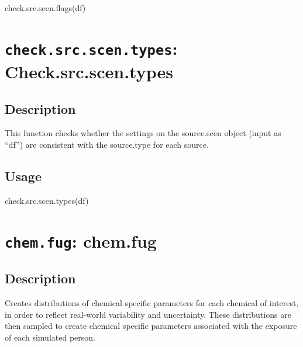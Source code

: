 \documentclass[
]{article}
\newenvironment{Shaded}{\begin{snugshade}}{\end{snugshade}}
\newcommand{\FunctionTok}[1]{\textcolor[rgb]{0.00,0.00,0.00}{#1}}
\newcommand{\NormalTok}[1]{#1}
\begin{document}
\begin{Shaded}
\begin{Highlighting}[]
\FunctionTok{check.src.scen.flags}\NormalTok{(df)}
\end{Highlighting}
\end{Shaded}

\hypertarget{check.src.scen.types-check.src.scen.types}{%
\section{\texorpdfstring{\texttt{check.src.scen.types}:
Check.src.scen.types}{check.src.scen.types: Check.src.scen.types}}\label{check.src.scen.types-check.src.scen.types}}

\hypertarget{description-7}{%
\subsection{Description}\label{description-7}}

This function checks whether the settings on the source.scen object
(input as ``df'') are consistent with the source.type for each source.

\hypertarget{usage-7}{%
\subsection{Usage}\label{usage-7}}

\begin{Shaded}
\begin{Highlighting}[]
\FunctionTok{check.src.scen.types}\NormalTok{(df)}
\end{Highlighting}
\end{Shaded}

\hypertarget{chem.fug-chem.fug}{%
\section{\texorpdfstring{\texttt{chem.fug}:
chem.fug}{chem.fug: chem.fug}}\label{chem.fug-chem.fug}}

\hypertarget{description-8}{%
\subsection{Description}\label{description-8}}

Creates distributions of chemical specific parameters for each chemical
of interest, in order to reflect real-world variability and uncertainty.
These distributions are then sampled to create chemical specific
parameters associated with the exposure of each simulated person.
\end{document}
